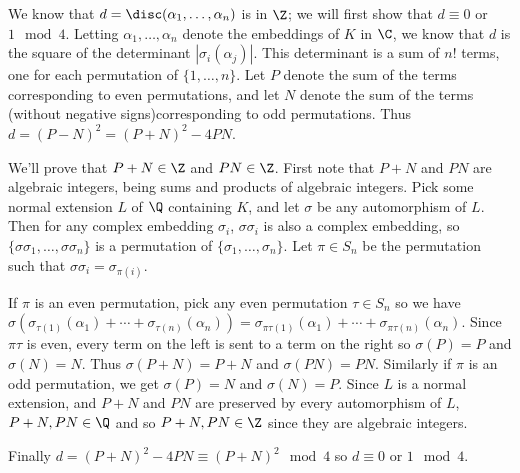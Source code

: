 \documentclass[11pt,letterpaper]{article}
\begin{document}
\begin{solution}
    We know that $d = \disc(\alpha_1,\ldots,\alpha_n)$ is in $\Z$; we will first show that $d \equiv 0$ or $1\mod 4$. Letting $\alpha_1, \ldots, \alpha_n$ denote the embeddings of $K$ in $\C$, we know that $d$ is the square of the determinant $\left|\sigma_i(\alpha_j)\right|$. This determinant is a sum of $n!$ terms, one for each permutation of $\{1,\ldots, n\}$. Let $P$ denote the sum of the terms corresponding to even permutations, and let $N$ denote the sum of the terms (without negative signs)corresponding to odd permutations. Thus $d =(P-N)^2 =(P+N)^2-4PN$. 
    
    We'll prove that $P+N\in \Z$ and $PN\in \Z$. First note that $P+N$ and $PN$ are algebraic integers, being sums and products of algebraic integers. Pick some normal extension $L$ of $\Q$ containing $K$, and let $\sigma$ be any automorphism of $L$. Then for any complex embedding $\sigma_i$, $\sigma\sigma_i$ is also a complex embedding, so $\{\sigma\sigma_1,\ldots,\sigma\sigma_n\}$ is a permutation of $\{\sigma_1,\ldots,\sigma_n\}$. Let $\pi\in S_n$ be the permutation such that $\sigma\sigma_i=\sigma_{\pi(i)}$. 
    
    If $\pi$ is an even permutation, pick any even permutation $\tau\in S_n$ so we have $\sigma(\sigma_{\tau(1)}(\alpha_1)+\cdots+\sigma_{\tau(n)}(\alpha_n))=\sigma_{\pi \tau(1)}(\alpha_1)+\cdots+\sigma_{\pi\tau(n)}(\alpha_n)$. Since $\pi\tau$ is even, every term on the left is sent to a term on the right so $\sigma(P)=P$ and $\sigma(N)=N$. Thus $\sigma(P+N)=P+N$ and $\sigma(PN)=PN$. Similarly if $\pi$ is an odd permutation, we get $\sigma(P)=N$ and $\sigma(N)=P$. Since $L$ is a normal extension, and $P+N$ and $PN$ are preserved by every automorphism of $L$, $P+N, PN\in \Q$ and so $P+N, PN\in \Z$ since they are algebraic integers.
    
    Finally $d=(P+N)^2-4PN\equiv (P+N)^2\mod 4$ so $d\equiv 0$ or $1\mod 4$. 
\end{solution}

\end{document}
